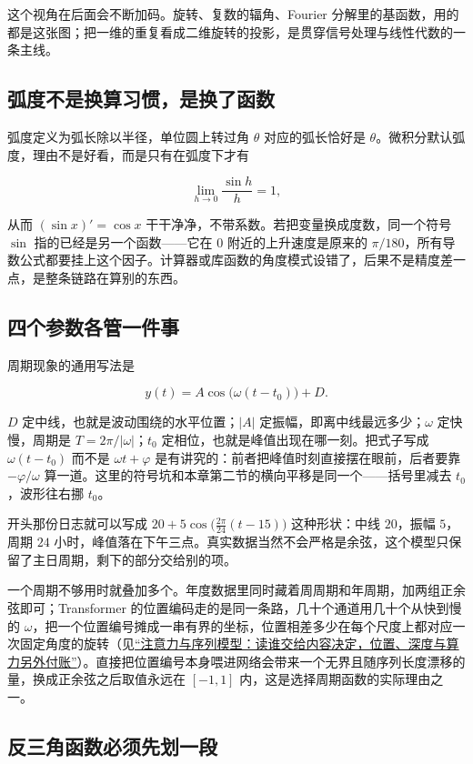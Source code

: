 这个视角在后面会不断加码。旋转、复数的辐角、Fourier 分解里的基函数，用的都是这张图；把一维的重复看成二维旋转的投影，是贯穿信号处理与线性代数的一条主线。

\subsection{弧度不是换算习惯，是换了函数}

弧度定义为弧长除以半径，单位圆上转过角 \(\theta\) 对应的弧长恰好是 \(\theta\)。微积分默认弧度，理由不是好看，而是只有在弧度下才有

\[
\lim_{h\to0}\frac{\sin h}{h}=1,
\]

从而 \((\sin x)'=\cos x\) 干干净净，不带系数。若把变量换成度数，同一个符号 \(\sin\) 指的已经是另一个函数——它在 \(0\) 附近的上升速度是原来的 \(\pi/180\)，所有导数公式都要挂上这个因子。计算器或库函数的角度模式设错了，后果不是精度差一点，是整条链路在算别的东西。

\subsection{四个参数各管一件事}

周期现象的通用写法是

\[
y(t)=A\cos\bigl(\omega(t-t_0)\bigr)+D .
\]

\(D\) 定中线，也就是波动围绕的水平位置；\(|A|\) 定振幅，即离中线最远多少；\(\omega\) 定快慢，周期是 \(T=2\pi/|\omega|\)；\(t_0\) 定相位，也就是峰值出现在哪一刻。把式子写成 \(\omega(t-t_0)\) 而不是 \(\omega t+\varphi\) 是有讲究的：前者把峰值时刻直接摆在眼前，后者要靠 \(-\varphi/\omega\) 算一道。这里的符号坑和本章第二节的横向平移是同一个——括号里减去 \(t_0\)，波形往右挪 \(t_0\)。

开头那份日志就可以写成 \(20+5\cos\bigl(\tfrac{2\pi}{24}(t-15)\bigr)\) 这种形状：中线 \(20\)，振幅 \(5\)，周期 \(24\) 小时，峰值落在下午三点。真实数据当然不会严格是余弦，这个模型只保留了主日周期，剩下的部分交给别的项。

一个周期不够用时就叠加多个。年度数据里同时藏着周周期和年周期，加两组正余弦即可；Transformer 的位置编码走的是同一条路，几十个通道用几十个从快到慢的 \(\omega\)，把一个位置编号摊成一串有界的坐标，位置相差多少在每个尺度上都对应一次固定角度的旋转（见\hyperref[ch:127]{``注意力与序列模型：读谁交给内容决定，位置、深度与算力另外付账''}）。直接把位置编号本身喂进网络会带来一个无界且随序列长度漂移的量，换成正余弦之后取值永远在 \([-1,1]\) 内，这是选择周期函数的实际理由之一。

\subsection{反三角函数必须先划一段}

